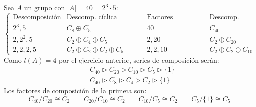 \begin{ejemplo} %
    Sea $A$ un grupo con $|A| = 40 = 2^3\cdot 5$:
    \begin{equation*}
        \left\{\begin{array}{c|c|c|c}
                \text{Descomposición} & \text{Descomp. cíclica primaria} & \text{Factores invariantes} & \text{Descomp. cíclica} \\
                \hline
                2^3, 5 & C_8 \oplus C_5 & 40 & C_{40} \\
                2, 2^2, 5 & C_2 \oplus C_4 \oplus C_5 & 2, 20 & C_2 \oplus C_{20} \\
                2, 2, 2, 5 & C_2 \oplus C_2 \oplus C_2 \oplus C_5 & 2, 2, 10 & C_2 \oplus C_2\oplus C_{10}
        \end{array}\right.
    \end{equation*}
    Como $l(A) = 4$ por el ejercicio anterior, series de composición serán:
    \begin{align*}
        &C_{40} \rhd C_{20} \rhd C_{10} \rhd C_5 \rhd \{1\} \\
        &C_{40} \rhd C_{8} \rhd C_{4} \rhd C_2 \rhd \{1\} 
    \end{align*}
    Los factores de composición de la primera son:
    \begin{equation*}
        C_{40}/C_{20} \cong C_2 \qquad C_{20}/C_{10}\cong C_2 \qquad C_{10}/C_5\cong C_2 \qquad C_5/\{1\}\cong C_5
    \end{equation*}
\end{ejemplo}

